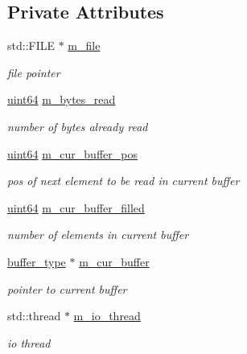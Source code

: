 \subsection*{Private Attributes}
\begin{DoxyCompactItemize}
\item 
std\+::\+F\+I\+LE $\ast$ \hyperlink{classasync__stream__reader_ae071a19d938b35853aecdef137a3cfdb}{m\+\_\+file}
\begin{DoxyCompactList}\small\item\em file pointer \end{DoxyCompactList}\item 
\hyperlink{types_8h_a60e8696a4678cd348e991a1f172e53f7}{uint64} \hyperlink{classasync__stream__reader_a5268366ca42bd2ef430e9e0817e9b274}{m\+\_\+bytes\+\_\+read}
\begin{DoxyCompactList}\small\item\em number of bytes already read \end{DoxyCompactList}\item 
\hyperlink{types_8h_a60e8696a4678cd348e991a1f172e53f7}{uint64} \hyperlink{classasync__stream__reader_a8a1fa1966f7523fd4054e06cdd118234}{m\+\_\+cur\+\_\+buffer\+\_\+pos}
\begin{DoxyCompactList}\small\item\em pos of next element to be read in current buffer \end{DoxyCompactList}\item 
\hyperlink{types_8h_a60e8696a4678cd348e991a1f172e53f7}{uint64} \hyperlink{classasync__stream__reader_a0414700ede611b3cbf26ef640c239709}{m\+\_\+cur\+\_\+buffer\+\_\+filled}
\begin{DoxyCompactList}\small\item\em number of elements in current buffer \end{DoxyCompactList}\item 
\hyperlink{classasync__stream__reader_a48e2b7d24cfceba922a771e9c314b40c}{buffer\+\_\+type} $\ast$ \hyperlink{classasync__stream__reader_a167103fd4cb153047682ec786d234f2f}{m\+\_\+cur\+\_\+buffer}
\begin{DoxyCompactList}\small\item\em pointer to current buffer \end{DoxyCompactList}\item 
std\+::thread $\ast$ \hyperlink{classasync__stream__reader_a50b44a356f5c742f20d7ea31bebc018e}{m\+\_\+io\+\_\+thread}
\begin{DoxyCompactList}\small\item\em io thread \end{DoxyCompactList}\item 

\end{DoxyCompactItemize}
